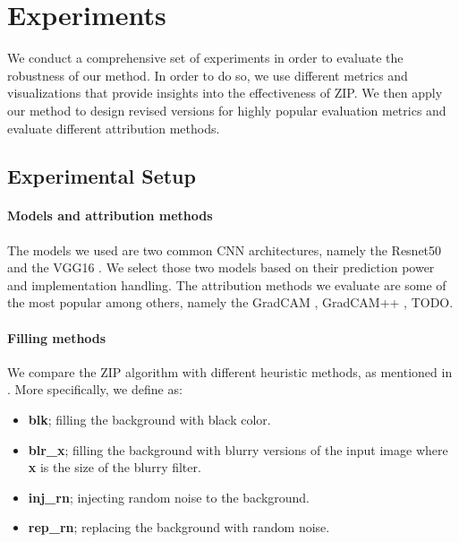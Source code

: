 \section{Experiments}
\label{sec:exp}

We conduct a comprehensive set of experiments in order to evaluate the robustness of our method. In order to do so, we use different metrics and visualizations that provide insights into the effectiveness of ZIP. We then apply our method to design revised versions for highly popular evaluation metrics and evaluate different attribution methods.


\subsection{Experimental Setup}
\label{sec:exp-setup}

\paragraph{Models and attribution methods} The models we used are two common CNN architectures, namely the Resnet50 \citep{he2015deep} and the VGG16 \citep{simonyan2015deep}. We select those two models based on their prediction power and implementation handling. The attribution methods we evaluate are some of the most popular among others, namely the GradCAM \citep{selvaraju2017gradcam}, GradCAM++ \citep{Chattopadhay_2018}, TODO.


\paragraph{Filling methods} We compare the ZIP algorithm with different heuristic methods, as mentioned in \citep{haug2021baselines}. More specifically, we define as:
\begin{itemize}
	\item \textbf{blk}; filling the background with black color.
	\item \textbf{blr\_x}; filling the background with blurry versions of the input image where \textbf{x} is the size of the blurry filter.
	\item \textbf{inj\_rn}; injecting random noise to the background.
	\item \textbf{rep\_rn}; replacing the background with random noise.
\end{itemize}

